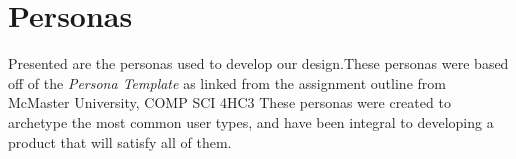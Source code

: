 \documentclass[10pt]{article}
\begin{document}
%
%
%


\section*{Personas}\vspace{2mm}

Presented are the personas used to develop our design.These personas were based off of the \emph{Persona Template} as linked from the assignment outline from McMaster University, COMP SCI 4HC3 These personas were created to archetype the most common user types, and have been integral to developing a product that will satisfy all of them.\\

%
\end{document}
